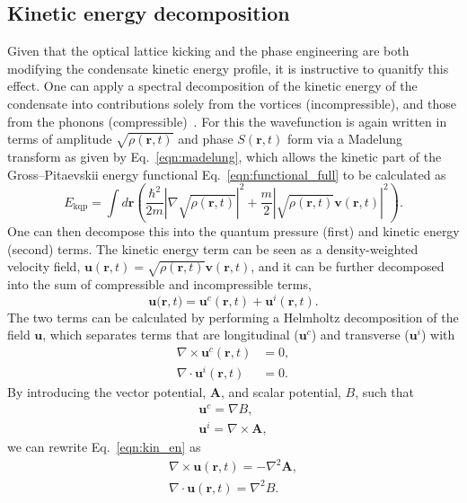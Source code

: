 {\subsection{Kinetic energy decomposition}\label{sec:kinspec}
Given that the optical lattice kicking and the phase engineering are both modifying the condensate kinetic energy profile, it is instructive to quanitfy this effect. One can apply a spectral decomposition of the kinetic energy of the condensate into contributions solely from the vortices (incompressible), and those from the phonons (compressible)~\cite{CT:Nore_prl_1997,CT:Nore_pof_1997,CT:Bradley_prx_2012}. For this the wavefunction is again written in terms of amplitude $\sqrt{\rho(\mathbf{r},t)}$ and phase $S(\mathbf{r},t)$ form via a Madelung transform as given by Eq.~\eqref{eqn:madelung}, which allows the kinetic part of the Gross--Pitaevskii energy functional Eq.~\eqref{eqn:functional_full} to be calculated as
\begin{equation}
    E_{\text{kqp}} = \int d\mathbf{r} \left( \frac{\hbar^2}{2m}| \nabla\sqrt{\rho(\mathbf{r},t)} |^2  + \frac{m}{2}|\sqrt{\rho(\mathbf{r},t)}\mathbf{v}(\mathbf{r},t) |^2\right).
\end{equation}
One can then decompose this into the quantum pressure (first) and kinetic energy (second) terms. The kinetic energy term can be seen as a density-weighted velocity field, $\mathbf{u}(\mathbf{r},t) = \sqrt{\rho(\mathbf{r},t)}\mathbf{v}(\mathbf{r},t)$, and it can be further decomposed into the sum of compressible and incompressible terms,
\begin{equation}\label{eqn:kin_en}
    \mathbf{u(r},t) = \mathbf{u}^c(\mathbf{r},t) + \mathbf{u}^i(\mathbf{r},t).
\end{equation}
The two terms can be calculated by performing a Helmholtz decomposition of the field $\mathbf{u}$, which separates terms that are longitudinal ($\mathbf{u}^c$) and transverse ($\mathbf{u}^i$) with
\begin{subequations}\label{eqn:kinterms}
\begin{align}
    \nabla \times \mathbf{u}^c(\mathbf{r},t) &= 0, \\
    \nabla \cdot \mathbf{u}^i(\mathbf{r},t) &= 0.
\end{align}
\end{subequations}
By introducing the vector potential, $\mathbf{A}$, and scalar potential, $B$, such that
\begin{subequations}
\begin{align}
    \mathbf{u}^c = \nabla B, \\
    \mathbf{u}^i = \nabla \times \mathbf{A},
\end{align}
\end{subequations}
we can rewrite Eq.~\eqref{eqn:kin_en} as
\begin{align}
    \nabla \times \mathbf{u}(\mathbf{r},t) = -\nabla^2 \mathbf{A}, \\
    \nabla \cdot \mathbf{u}(\mathbf{r},t) = \nabla^2 {B}.
\end{align}

}
